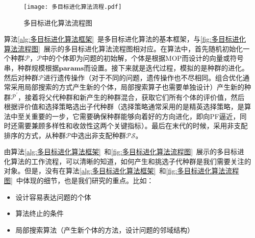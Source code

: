 \par
\begin{figure}[htb]
    \texttt{[image: 多目标进化算法流程.pdf]}
    \caption{多目标进化算法流程图}
    \label{fig:多目标进化算法流程图}
\end{figure}
\par
算法\ref{alg:多目标进化算法框架}~是多目标进化算法的基本框架，与\autoref{fig:多目标进化算法流程图}~展示的多目标进化算法流程图相对应。在算法中，首先随机初始化一个种群$\mathcal{P}$，$\mathcal{P}$中的个体即为问题的初始解，个体是根据MOP而设计的向量或符号串，种群规模根据$\mathbf{params}$而设置。接下来就是迭代过程，模拟的是种群的进化。然后对种群$\mathcal{P}$进行遗传操作（对于不同的问题，遗传操作也不尽相同。组合优化通常采用局部搜索的方式产生新的个体，局部搜索算子也需要单独设计）产生新的种群$\mathcal{P}^{'}$，接着将父代种群和新产生的种群混合，获取它们所有个体的评价值，然后根据评价值和选择策略选出子代种群（选择策略通常采用的是精英选择策略，是算法中至关重要的一步，它需要确保种群能够向着好的方向进化，即向PF逼近，同时还需要兼顾多样性和收敛性这两个关键指标）。最后在末代的时候，采用非支配排序的方式，从种群$\mathcal{P}$中选出非支配种群$\mathcal{PS}$。
\par
由算法\ref{alg:多目标进化算法框架}~和\autoref{fig:多目标进化算法流程图}~展示的多目标进化算法的工作流程，可以清晰的知道，如何产生和挑选子代种群是我们需要关注的对象。但是，没有在算法\ref{alg:多目标进化算法框架}~和\autoref{fig:多目标进化算法流程图}~中体现的细节，也是我们研究的重点。比如：
\begin{itemize}
    \item 设计容易表达问题的个体
    \item 算法终止的条件
    \item 局部搜索算法（产生新个体的方法，设计问题的邻域结构）
\end{itemize}

